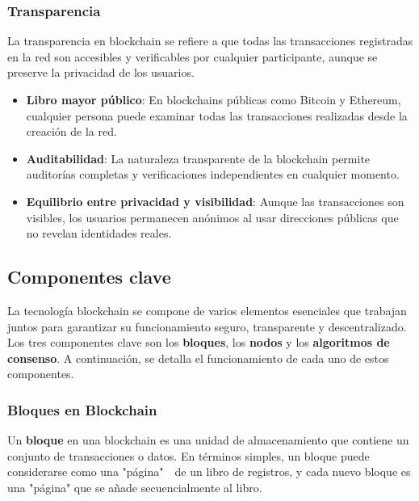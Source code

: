 \subsubsection{Transparencia}  
La transparencia en blockchain se refiere a que todas las transacciones registradas en la red son accesibles y verificables por cualquier participante, aunque se preserve la privacidad de los usuarios.

\begin{itemize}
    \item \textbf{Libro mayor público}: En blockchains públicas como Bitcoin y Ethereum, cualquier persona puede examinar todas las transacciones realizadas desde la creación de la red.
    \item \textbf{Auditabilidad}: La naturaleza transparente de la blockchain permite auditorías completas y verificaciones independientes en cualquier momento.
    \item \textbf{Equilibrio entre privacidad y visibilidad}: Aunque las transacciones son visibles, los usuarios permanecen anónimos al usar direcciones públicas que no revelan identidades reales.
\end{itemize}

\subsection{Componentes clave}

La tecnología blockchain se compone de varios elementos esenciales que trabajan juntos para garantizar su funcionamiento seguro, transparente y descentralizado. Los tres componentes clave son los \textbf{bloques}, los \textbf{nodos} y los \textbf{algoritmos de consenso}. A continuación, se detalla el funcionamiento de cada uno de estos componentes.

\subsubsection{Bloques en Blockchain}

Un \textbf{bloque} en una blockchain es una unidad de almacenamiento que contiene un conjunto de transacciones o datos. En términos simples, un bloque puede considerarse como una "página"\ \ de un libro de registros, y cada nuevo bloque es una "página" que se añade secuencialmente al libro.

